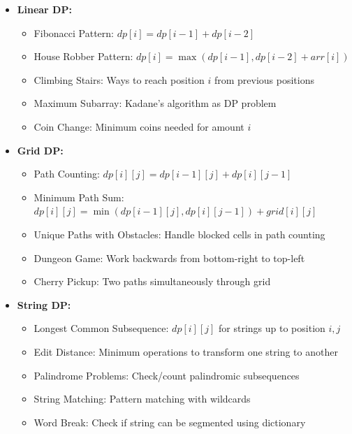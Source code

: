 \documentclass[a4paper,10pt]{book}
\begin{document}
\begin{itemize}[leftmargin=*]
    \item \textbf{Linear DP:}
    \begin{itemize}
        \item Fibonacci Pattern: $dp[i] = dp[i-1] + dp[i-2]$
        \item House Robber Pattern: $dp[i] = \max(dp[i-1], dp[i-2] + arr[i])$
        \item Climbing Stairs: Ways to reach position $i$ from previous positions
        \item Maximum Subarray: Kadane's algorithm as DP problem
        \item Coin Change: Minimum coins needed for amount $i$
    \end{itemize}

    \item \textbf{Grid DP:}
    \begin{itemize}
        \item Path Counting: $dp[i][j] = dp[i-1][j] + dp[i][j-1]$
        \item Minimum Path Sum: $dp[i][j] = \min(dp[i-1][j], dp[i][j-1]) + grid[i][j]$
        \item Unique Paths with Obstacles: Handle blocked cells in path counting
        \item Dungeon Game: Work backwards from bottom-right to top-left
        \item Cherry Pickup: Two paths simultaneously through grid
    \end{itemize}

    \item \textbf{String DP:}
    \begin{itemize}
        \item Longest Common Subsequence: $dp[i][j]$ for strings up to position $i,j$
        \item Edit Distance: Minimum operations to transform one string to another
        \item Palindrome Problems: Check/count palindromic subsequences
        \item String Matching: Pattern matching with wildcards
        \item Word Break: Check if string can be segmented using dictionary
    \end{itemize}
\end{itemize}
\end{document}
